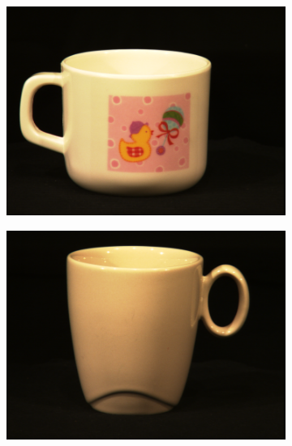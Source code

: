 \begin{figure}[tbp]
    \begin{subfigure}{80pt}
        \centering
    \includegraphics[width=\textwidth]{figures/aloi_original/36.png}
    \caption{}
	\end{subfigure}
	\begin{subfigure}{80pt}
        \centering
    \includegraphics[width=\textwidth]{figures/aloi_original/125.png}
    \caption{}
	\end{subfigure}
	\begin{subfigure}{80pt}
        \centering

\end{subfigure}
\end{figure}
